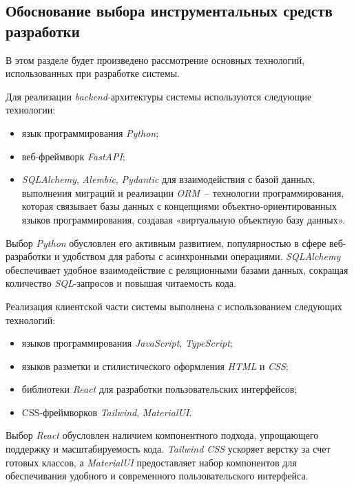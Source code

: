 \subsection{Обоснование выбора инструментальных средств разработки}
\label{sub:system-design:dev-tools}

В этом разделе будет произведено рассмотрение основных технологий, использованных при разработке системы.

Для реализации \textit{backend}-архитектуры системы используются следующие технологии:

\begin{itemize}
    \item язык программирования \textit{Python};
    \item веб-фреймворк \textit{FastAPI};
    \item \textit{SQLAlchemy}, \textit{Alembic}, \textit{Pydantic} для взаимодействия с базой данных, выполнения миграций и реализации \textit{ORM}~-- технологии программирования, которая связывает базы данных с концепциями объектно-ориентированных языков программирования, создавая «виртуальную объектную базу данных».
\end{itemize}

Выбор \textit{Python} обусловлен его активным развитием, популярностью в сфере веб-разработки и удобством для работы с асинхронными операциями. \textit{SQLAlchemy} обеспечивает удобное взаимодействие с реляционными базами данных, сокращая количество \textit{SQL}-запросов и повышая читаемость кода.

Реализация клиентской части системы выполнена с использованием следующих технологий:

\begin{itemize}
    \item языков программирования \textit{JavaScript}, \textit{TypeScript};
    \item языков разметки и стилистического оформления \textit{HTML} и \textit{CSS};
    \item библиотеки \textit{React} для разработки пользовательских интерфейсов;
    \item CSS-фреймворков \textit{Tailwind}, \textit{MaterialUI}.
\end{itemize}

Выбор \textit{React} обусловлен наличием компонентного подхода, упрощающего поддержку и масштабируемость кода. \textit{Tailwind CSS} ускоряет верстку за счет готовых классов, а \textit{MaterialUI} предоставляет набор компонентов для обеспечивания удобного и современного пользовательского интерфейса.

